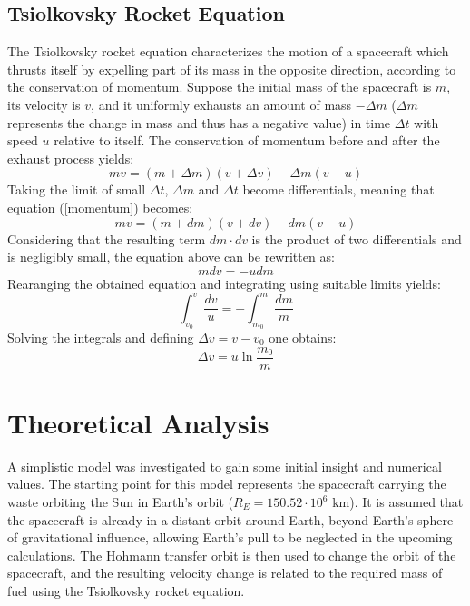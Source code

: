 \documentclass[onecolumn,12pt]{article}
\numberwithin{equation}{section}
\begin{document}
\subsection{Tsiolkovsky Rocket Equation}
The Tsiolkovsky rocket equation characterizes the motion of a spacecraft which thrusts itself by expelling part of its mass in the opposite direction, according to the conservation of momentum. Suppose the initial mass of the spacecraft is $m$, its velocity is $v$, and it uniformly exhausts an amount of mass $-\Delta m$ ($\Delta m$ represents the change in mass and thus has a negative value) in time $\Delta t$ with speed $u$ relative to itself. The conservation of momentum before and after the exhaust process yields:
\begin{equation}
    mv = (m + \Delta m)(v + \Delta v) -\Delta m(v - u)
    \label{momentum}
\end{equation}
Taking the limit of small $\Delta t$, $\Delta m$ and $\Delta t$ become differentials, meaning that equation (\ref{momentum}) becomes:
\begin{equation}
    mv = (m + dm)(v + dv) -dm(v - u)
\end{equation}
Considering that the resulting term $dm \cdot dv$ is the product of two differentials and is negligibly small, the equation above can be rewritten as:
\begin{equation}
    m dv = -u dm
\end{equation}
Rearanging the obtained equation and integrating using suitable limits yields:
\begin{equation}
    \int_{v_0}^{v} \frac{dv}{u}= -\int_{m_0}^{m} \frac{dm}{m}
\end{equation}
Solving the integrals and defining $\Delta v = v - v_0$ one obtains:
\begin{equation}
    \Delta v = u \ln \frac{m_0}{m}
    \label{tsiolkovsky}
\end{equation}

\section{Theoretical Analysis}

A simplistic model was investigated to gain some initial insight and numerical values. The starting point for this model represents the spacecraft carrying the waste orbiting the Sun in Earth's orbit ($R_E = 150.52 \cdot10^6 \text{ km}$). It is assumed that the spacecraft is already in a distant orbit around Earth, beyond Earth's sphere of gravitational influence, allowing Earth's pull to be neglected in the upcoming calculations. The Hohmann transfer orbit is then used to change the orbit of the spacecraft, and the resulting velocity change is related to the required mass of fuel using the Tsiolkovsky rocket equation.
\end{document}
